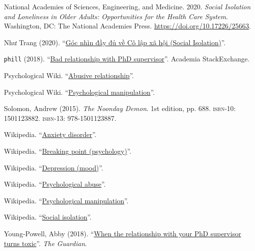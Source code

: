 \documentclass[12pt]{article}
\numberwithin{equation}{section}
\begin{document}
\begin{thebibliography}{99}
     National Academies of Sciences, Engineering, and Medicine. 2020. \textit{Social Isolation and Loneliness in Older Adults: Opportunities for the Health Care System}. Washington, DC: The National Academies Press. \href{https://www.nap.edu/catalog/25663/social-isolation-and-loneliness-in-older-adults-opportunities-for-the}{https://doi.org/10.17226/25663}.
    
     Như Trang (2020). ``\href{https://trangtamly.blog/2020/04/07/goc-nhin-day-du-ve-co-lap-xa-hoi-social-isolation/}{Góc nhìn đầy đủ về Cô lập xã hội (Social Isolation)}''.
    
     \texttt{phill} (2018). ``\href{https://academia.stackexchange.com/questions/111022/bad-relationship-with-phd-supervisor}{Bad relationship with PhD supervisor}''. Academia StackExchange.
    
     Psychological Wiki. ``\href{https://psychology.wikia.org/wiki/Abusive_relationship}{Abusive relationship}''.
    
     Psychological Wiki. ``\href{https://psychology.wikia.org/wiki/Psychological_manipulation}{Psychological manipulation}''.
    
     Solomon, Andrew (2015). \textit{The Noonday Demon}. 1st edition, pp. 688. \textsc{isbn-10}: 1501123882. \textsc{isbn-13}: 978-1501123887.
    
     Wikipedia. ``\href{https://en.wikipedia.org/wiki/Anxiety_disorder}{Anxiety disorder}''.
    
     Wikipedia. ``\href{https://en.wikipedia.org/wiki/Breaking_point_(psychology)}{Breaking point (psychology)}''.
    
     Wikipedia. ``\href{https://en.wikipedia.org/wiki/Depression_(mood)}{Depression (mood)}''.
    
     Wikipedia. ``\href{https://en.wikipedia.org/wiki/Psychological_abuse}{Psychological abuse}''.
    
     Wikipedia. ``\href{https://en.wikipedia.org/wiki/Psychological_manipulation}{Psychological manipulation}''.
    
     Wikipedia. ``\href{https://en.wikipedia.org/wiki/Social_isolation}{Social isolation}''.
    
     Young-Powell, Abby (2018). ``\href{https://www.theguardian.com/education/2018/jan/22/when-the-relationship-with-your-phd-supervisor-turns-toxic#comment-111169208}{When the relationship with your PhD supervisor turns toxic}''. \textit{The Guardian}.
\end{thebibliography}
\end{document}
